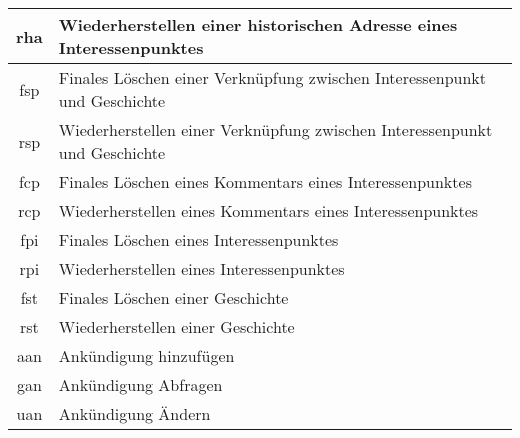 \begin{longtable}[H]{|c|p{12cm}|}
		rha                 & Wiederherstellen einer historischen Adresse eines Interessenpunktes                                                                                \\ \hline
		fsp                 & Finales Löschen einer Verknüpfung zwischen Interessenpunkt und Geschichte                                                                          \\ \hline
		rsp                 & Wiederherstellen einer Verknüpfung zwischen Interessenpunkt und Geschichte                                                                         \\ \hline
		fcp                 & Finales Löschen eines Kommentars eines Interessenpunktes                                                                                           \\ \hline
		rcp                 & Wiederherstellen eines Kommentars eines Interessenpunktes                                                                                          \\ \hline
		fpi                 & Finales Löschen eines Interessenpunktes                                                                                                            \\ \hline
		rpi                 & Wiederherstellen eines Interessenpunktes                                                                                                           \\ \hline
		fst                 & Finales Löschen einer Geschichte                                                                                                                   \\ \hline
		rst                 & Wiederherstellen einer Geschichte                                                                                                                  \\ \hline
		aan                 & Ankündigung hinzufügen                                                                                                                             \\ \hline
		gan                 & Ankündigung Abfragen                                                                                                                               \\ \hline
		uan                 & Ankündigung Ändern                                                                                                                                 \\ \hline

\end{longtable}
